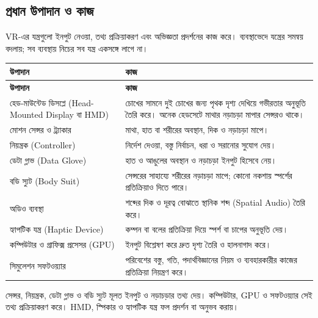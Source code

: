 \begin{topicbody}
\subsection{প্রধান উপাদান ও কাজ}
VR-এর যন্ত্রগুলো ইনপুট নেওয়া, তথ্য প্রক্রিয়াকরণ এবং অভিজ্ঞতা প্রদর্শনের কাজ করে। ব্যবস্থাভেদে যন্ত্রের সমন্বয় বদলায়; সব ব্যবস্থায় নিচের সব যন্ত্র একসঙ্গে লাগে না।
\begin{compacttable}
\begin{longtable}{|p{}|p{}|}
\hline\textbf{উপাদান} & \textbf{কাজ}\\\hline\endfirsthead
\hline\textbf{উপাদান} & \textbf{কাজ}\\\hline\endhead
হেড-মাউন্টেড ডিসপ্লে (Head-Mounted Display বা HMD) & চোখের সামনে দুই চোখের জন্য পৃথক দৃশ্য দেখিয়ে গভীরতার অনুভূতি তৈরি করে। অনেক হেডসেটে মাথার নড়াচড়া মাপার সেন্সরও থাকে।\\\hline
মোশন সেন্সর ও ট্র্যাকার & মাথা, হাত বা শরীরের অবস্থান, দিক ও নড়াচড়া মাপে।\\\hline
নিয়ন্ত্রক (Controller) & নির্দেশ দেওয়া, বস্তু নির্বাচন, ধরা ও সরানোর সুযোগ দেয়।\\\hline
ডেটা গ্লাভ (Data Glove) & হাত ও আঙুলের অবস্থান ও নড়াচড়া ইনপুট হিসেবে নেয়।\\\hline
বডি স্যুট (Body Suit) & সেন্সরের সাহায্যে শরীরের নড়াচড়া মাপে; কোনো নকশায় স্পর্শের প্রতিক্রিয়াও দিতে পারে।\\\hline
অডিও ব্যবস্থা & শব্দের দিক ও দূরত্ব বোঝাতে স্থানিক শব্দ (Spatial Audio) তৈরি করে।\\\hline
হ্যাপটিক যন্ত্র (Haptic Device) & কম্পন বা বলের প্রতিক্রিয়া দিয়ে স্পর্শ বা চাপের অনুভূতি দেয়।\\\hline
কম্পিউটার ও গ্রাফিক্স প্রসেসর (GPU) & ইনপুট বিশ্লেষণ করে দ্রুত দৃশ্য তৈরি ও হালনাগাদ করে।\\\hline
সিমুলেশন সফটওয়্যার & পরিবেশের বস্তু, গতি, পদার্থবিজ্ঞানের নিয়ম ও ব্যবহারকারীর কাজের প্রতিক্রিয়া নিয়ন্ত্রণ করে।\\\hline
\end{longtable}
\end{compacttable}
সেন্সর, নিয়ন্ত্রক, ডেটা গ্লাভ ও বডি স্যুট মূলত ইনপুট ও নড়াচড়ার তথ্য দেয়। কম্পিউটার, GPU ও সফটওয়্যার সেই তথ্য প্রক্রিয়াকরণ করে। HMD, স্পিকার ও হ্যাপটিক যন্ত্র ফল প্রদর্শন বা অনুভব করায়।

\end{topicbody}
